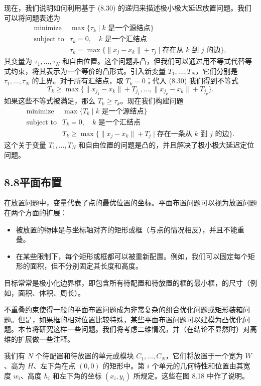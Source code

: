 \documentclass[UTF8, 12pt, fontset=fandol, oneside]{ctexart}
\begin{document}
现在，我们说明如何利用基于 (8.30) 的递归来描述极小极大延迟放置问题。我们可以将问题表述为
\[
\begin{array}{ll}
\mbox{minimize} & \max\{\tau_k\mid k\mbox{ 是一个源结点}\}\\
\mbox{subject to} & \tau_k=0,\quad k\mbox{ 是一个汇结点}\\
& \tau_k=\max\{\|x_j-x_k\|+\tau_j\mid \mbox{存在从 }k\mbox{ 到 }j\mbox{ 的边}\},
\end{array}
\]
其变量为 $\tau_1,\ldots,\tau_N$ 和自由位置。这个问题非凸，但我们可以通过用不等式代替等式约束，将其表示为一个等价的凸形式。引入新变量 $T_1,\ldots,T_N$，它们分别是 $\tau_1,\ldots,\tau_N$ 的上界。对于所有汇结点，取 $T_k=0$；代入 (8.30) 我们得到不等式
\[
T_k\geq \max\{\|x_{j_1}-x_k\|+T_{j_1},\ldots,\|x_{j_p}-x_k\|+T_{j_p}\}.
\]
如果这些不等式被满足，那么 $T_k\geq \tau_k$。现在我们构建问题
\[
\begin{array}{ll}
\mbox{minimize} & \max\{T_k\mid k\mbox{ 是一个源结点}\}\\
\mbox{subject to} & T_k=0,\quad k\mbox{ 是一个汇结点}\\
& T_k\geq \max\{\|x_j-x_k\|+T_j\mid \mbox{存在一条从 }k\mbox{ 到 }j\mbox{ 的边}\}.
\end{array}
\]
这个关于变量 $T_1,\ldots,T_N$ 和自由位置的问题是凸的，并且解决了极小极大延迟定位问题。

\subsection*{8.8\quad 平面布置}

在放置问题中，变量代表了点的最优位置的坐标。平面布置问题可以视为放置问题在两个方面的扩展：

\begin{itemize}
\item 被放置的物体是与坐标轴对齐的矩形或框（与点的情况相反），并且不能重叠。
\item 在某些限制下，每个矩形或框都可以被重新配置。例如，我们可以固定每个矩形的面积，但不分别固定其长度和高度。
\end{itemize}

目标常常是极小化边界框，即包含所有待配置和待放置的框的最小框，的尺寸（例如，面积、体积、周长）。

不重叠约束使得一般的平面布置问题成为非常复杂的组合优化问题或矩形装箱问题。但是，如果框的相对位置比较特殊，某些平面布置问题可以建模为凸优化问题。本节将研究这样一些问题。我们将考虑二维情况，并（在结论不显然时）对高维的扩展做一些注释。

我们有 $N$ 个待配置和待放置的单元或模块 $C_1,\ldots,C_N$，它们将放置于一个宽为 $W$、高为 $H$、左下角在点 $(0,0)$ 的矩形中。第 $i$ 个单元的几何特性和位置由其宽度 $w_i$、高度 $h_i$ 和左下角的坐标 $(x_i,y_i)$ 所规定。这些在图 8.18 中作了说明。
\end{document}
